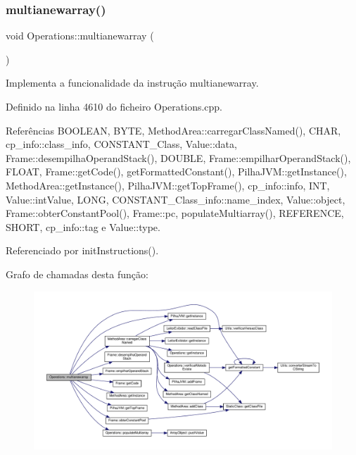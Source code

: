 \subsubsection{\texorpdfstring{multianewarray()}{multianewarray()}}
{\footnotesize\ttfamily void Operations\+::multianewarray (\begin{DoxyParamCaption}{ }\end{DoxyParamCaption})\hspace{0.3cm}{\ttfamily [private]}}



Implementa a funcionalidade da instrução multianewarray. 



Definido na linha 4610 do ficheiro Operations.\+cpp.



Referências B\+O\+O\+L\+E\+AN, B\+Y\+TE, Method\+Area\+::carregar\+Class\+Named(), C\+H\+AR, cp\+\_\+info\+::class\+\_\+info, C\+O\+N\+S\+T\+A\+N\+T\+\_\+\+Class, Value\+::data, Frame\+::desempilha\+Operand\+Stack(), D\+O\+U\+B\+LE, Frame\+::empilhar\+Operand\+Stack(), F\+L\+O\+AT, Frame\+::get\+Code(), get\+Formatted\+Constant(), Pilha\+J\+V\+M\+::get\+Instance(), Method\+Area\+::get\+Instance(), Pilha\+J\+V\+M\+::get\+Top\+Frame(), cp\+\_\+info\+::info, I\+NT, Value\+::int\+Value, L\+O\+NG, C\+O\+N\+S\+T\+A\+N\+T\+\_\+\+Class\+\_\+info\+::name\+\_\+index, Value\+::object, Frame\+::obter\+Constant\+Pool(), Frame\+::pc, populate\+Multiarray(), R\+E\+F\+E\+R\+E\+N\+CE, S\+H\+O\+RT, cp\+\_\+info\+::tag e Value\+::type.



Referenciado por init\+Instructions().

Grafo de chamadas desta função\+:
\nopagebreak
\begin{figure}[H]
\begin{center}
\leavevmode
\includegraphics[width=350pt]{classOperations_a78c45edfcdf63668974ffc3b2d84a309_cgraph}
\end{center}
\end{figure}
\mbox{\label{classOperations_a3537f097b63240202ac0c9249dda33a9}} 
